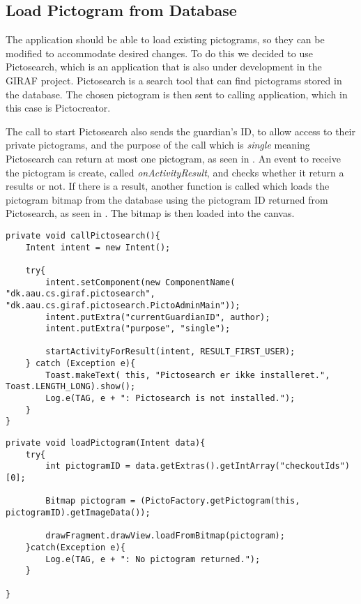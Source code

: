 \subsection{Load Pictogram from Database}
The application should be able to load existing pictograms, so they can be modified to accommodate desired changes.
To do this we decided to use Pictosearch, which is an application that is also under development in the GIRAF project.
Pictosearch is a search tool that can find pictograms stored in the database.
The chosen pictogram is then sent to calling application, which in this case is Pictocreator.

The call to start Pictosearch also sends the guardian's ID, to allow access to their private pictograms, and the purpose of the call which is \textit{single} meaning Pictosearch can return at most one pictogram, as seen in .
An event to receive the pictogram is create, called \textit{onActivityResult}, and checks whether it return a results or not.
If there is a result, another function is called which loads the pictogram bitmap from the database using the pictogram ID returned from Pictosearch, as seen in .
The bitmap is then loaded into the canvas.

\begin{lstlisting}[caption=Method used to launch Pictosearch., label=lst:callPictosearch]
private void callPictosearch(){
    Intent intent = new Intent();

    try{
        intent.setComponent(new ComponentName( "dk.aau.cs.giraf.pictosearch",  "dk.aau.cs.giraf.pictosearch.PictoAdminMain"));
        intent.putExtra("currentGuardianID", author);
        intent.putExtra("purpose", "single");

        startActivityForResult(intent, RESULT_FIRST_USER);
    } catch (Exception e){
        Toast.makeText( this, "Pictosearch er ikke installeret.", Toast.LENGTH_LONG).show();
        Log.e(TAG, e + ": Pictosearch is not installed.");
    }
}
\end{lstlisting}

\begin{lstlisting}[caption=Method to load a pictogram from Id received from Pictosearch, label=lst:loadPictogram]
private void loadPictogram(Intent data){
    try{
        int pictogramID = data.getExtras().getIntArray("checkoutIds")[0];

        Bitmap pictogram = (PictoFactory.getPictogram(this, pictogramID).getImageData());

        drawFragment.drawView.loadFromBitmap(pictogram);
    }catch(Exception e){
        Log.e(TAG, e + ": No pictogram returned.");
    }

}
\end{lstlisting}

